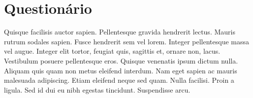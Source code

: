 \chapter{Questionário}
Quisque facilisis auctor sapien. Pellentesque gravida hendrerit lectus. Mauris rutrum
sodales sapien. Fusce hendrerit sem vel lorem. Integer pellentesque massa vel augue. Integer
elit tortor, feugiat quis, sagittis et, ornare non, lacus. Vestibulum posuere pellentesque eros.
Quisque venenatis ipsum dictum nulla. Aliquam quis quam non metus eleifend interdum.
Nam eget sapien ac mauris malesuada adipiscing. Etiam eleifend neque sed quam. Nulla
facilisi. Proin a ligula. Sed id dui eu nibh egestas tincidunt. Suspendisse arcu.